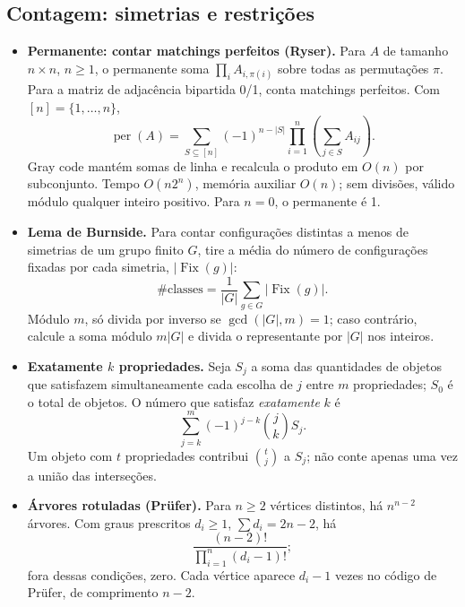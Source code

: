 
\subsection{Contagem: simetrias e restrições}
\begin{itemize}[leftmargin=*,label={}]
\item \textbf{Permanente: contar matchings perfeitos (Ryser).}
Para $A$ de tamanho $n\times n$, $n\ge1$, o permanente soma $\prod_i A_{i,\pi(i)}$ sobre todas as permutações $\pi$. Para a matriz de adjacência bipartida 0/1, conta matchings perfeitos. Com $[n]=\{1,\ldots,n\}$,
\[
\operatorname{per}(A)=\sum_{S\subseteq[n]}(-1)^{n-|S|}
\prod_{i=1}^{n}\left(\sum_{j\in S}A_{ij}\right).
\]
Gray code mantém somas de linha e recalcula o produto em $O(n)$ por subconjunto. Tempo $O(n2^n)$, memória auxiliar $O(n)$; sem divisões, válido módulo qualquer inteiro positivo. Para $n=0$, o permanente é 1.

\item \textbf{Lema de Burnside.}
Para contar configurações distintas a menos de simetrias de um grupo finito $G$, tire a média do número de configurações fixadas por cada simetria, $|\operatorname{Fix}(g)|$:
\[
\#\text{classes}=\frac{1}{|G|}\sum_{g\in G}|\operatorname{Fix}(g)|.
\]
Módulo $m$, só divida por inverso se $\gcd(|G|,m)=1$; caso contrário, calcule a soma módulo $m|G|$ e divida o representante por $|G|$ nos inteiros.

\item \textbf{Exatamente $k$ propriedades.}
Seja $S_j$ a soma das quantidades de objetos que satisfazem simultaneamente cada escolha de $j$ entre $m$ propriedades; $S_0$ é o total de objetos. O número que satisfaz \emph{exatamente} $k$ é
\[
\sum_{j=k}^{m}(-1)^{j-k}\binom{j}{k}S_j.
\]
Um objeto com $t$ propriedades contribui $\binom{t}{j}$ a $S_j$; não conte apenas uma vez a união das interseções.

\item \textbf{Árvores rotuladas (Prüfer).}
Para $n\ge2$ vértices distintos, há $n^{n-2}$ árvores. Com graus prescritos $d_i\ge1$, $\sum d_i=2n-2$, há
\[
\frac{(n-2)!}{\prod_{i=1}^{n}(d_i-1)!};
\]
fora dessas condições, zero. Cada vértice aparece $d_i-1$ vezes no código de Prüfer, de comprimento $n-2$.


\end{itemize}
